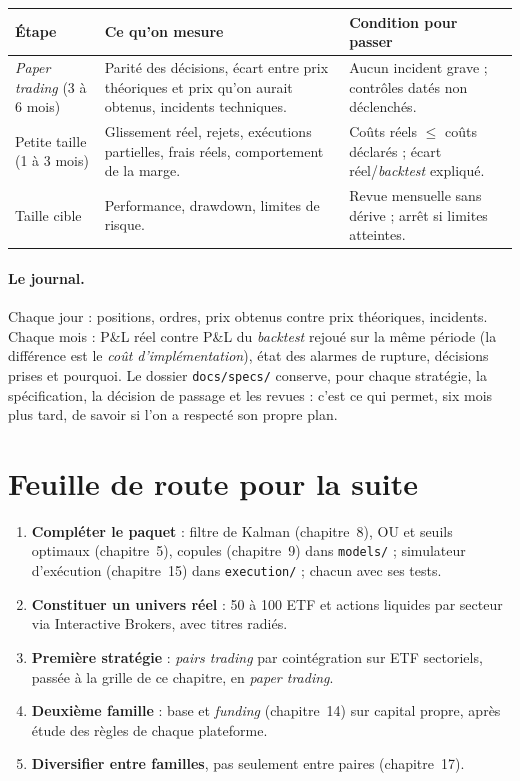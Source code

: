 \begin{center}\small
\begin{tabularx}{\textwidth}{>{\raggedright}p{2.6cm}>{\raggedright}X>{\raggedright\arraybackslash}p{4.2cm}}
\toprule
Étape & Ce qu'on mesure & Condition pour passer \\
\midrule
\emph{Paper trading} (3 à 6 mois) & Parité des décisions, écart entre prix théoriques et prix qu'on aurait obtenus, incidents techniques. & Aucun incident grave ; contrôles datés non déclenchés. \\
Petite taille (1 à 3 mois) & Glissement réel, rejets, exécutions partielles, frais réels, comportement de la marge. & Coûts réels $\le$ coûts déclarés ; écart réel/\emph{backtest} expliqué. \\
Taille cible & Performance, drawdown, limites de risque. & Revue mensuelle sans dérive ; arrêt si limites atteintes. \\
\bottomrule
\end{tabularx}
\end{center}

\paragraph{Le journal.} Chaque jour : positions, ordres, prix obtenus contre prix théoriques, incidents. Chaque mois : P\&L réel contre P\&L du \emph{backtest} rejoué sur la même période (la différence est le \emph{coût d'implémentation}), état des alarmes de rupture, décisions prises et pourquoi. Le dossier \texttt{docs/specs/} conserve, pour chaque stratégie, la spécification, la décision de passage et les revues : c'est ce qui permet, six mois plus tard, de savoir si l'on a respecté son propre plan.

\section{Feuille de route pour la suite}

\begin{enumerate}
\item \textbf{Compléter le paquet} : filtre de Kalman (chapitre~8), OU et seuils optimaux (chapitre~5), copules (chapitre~9) dans \texttt{models/} ; simulateur d'exécution (chapitre~15) dans \texttt{execution/} ; chacun avec ses tests.
\item \textbf{Constituer un univers réel} : 50 à 100 ETF et actions liquides par secteur via Interactive Brokers, avec titres radiés.
\item \textbf{Première stratégie} : \emph{pairs trading} par cointégration sur ETF sectoriels, passée à la grille de ce chapitre, en \emph{paper trading}.
\item \textbf{Deuxième famille} : base et \emph{funding} (chapitre~14) sur capital propre, après étude des règles de chaque plateforme.
\item \textbf{Diversifier entre familles}, pas seulement entre paires (chapitre~17).
\end{enumerate}

